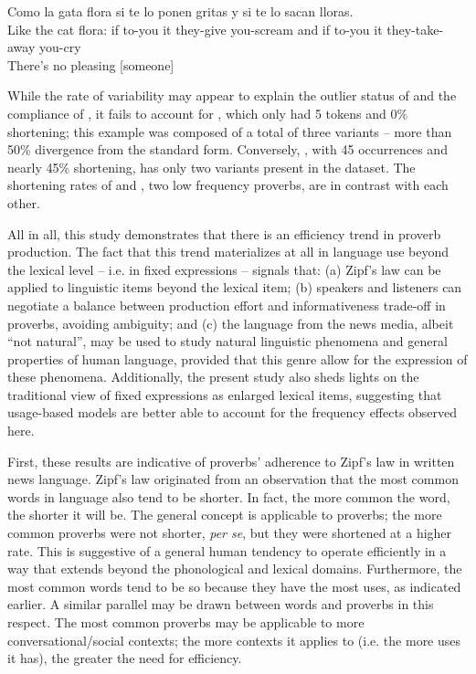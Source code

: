 \documentclass[output=paper,colorlinks,citecolor=brown,draftmode]{langscibook}
\begin{document}
\ex 
\gll Como la gata flora si te lo ponen gritas y si te lo sacan lloras.\\
Like 	the 	cat 	flora: 	if 	to-you 	it 	they-give you-scream 	and 	if 	to-you 	it 	they-take-away you-cry\\
\glt There’s no pleasing [someone]\\
\z
\z

While the rate of variability may appear to explain the outlier status of  and the compliance of , it fails to account for , which only had 5 tokens and 0\% shortening; this example was composed of a total of three variants -- more than 50\% divergence from the standard form. Conversely, , with 45 occurrences and nearly 45\% shortening, has only two variants present in the dataset. The shortening rates of  and , two low frequency proverbs, are in contrast with each other.

All in all, this study demonstrates that there is an efficiency trend in proverb production. The fact that this trend materializes at all in language use beyond the lexical level -- i.e. in fixed expressions -- signals that: (a) Zipf's law can be applied to linguistic items beyond the lexical item; (b) speakers and listeners can negotiate a balance between production effort and informativeness trade-off in proverbs, avoiding ambiguity; and (c) the language from the news media, albeit ``not natural'', may be used to study natural linguistic phenomena and general properties of human language, provided that this genre allow for the expression of these phenomena. Additionally, the present study also sheds lights on the traditional view of fixed expressions as enlarged lexical items, suggesting that usage-based models are better able to account for the frequency effects observed here.

First, these results are indicative of proverbs' adherence to Zipf's law in written news language. Zipf's law originated from an observation that the most common words in language also tend to be shorter. In fact, the more common the word, the shorter it will be. The general concept is applicable to proverbs; the more common proverbs were not shorter, \emph{per se}, but they were shortened at a higher rate. This is suggestive of a general human tendency to operate efficiently in a way that extends beyond the phonological and lexical domains. Furthermore, the most common words tend to be so because they have the most uses, as indicated earlier. A similar parallel may be drawn between words and proverbs in this respect. The most common proverbs may be applicable to more conversational/social contexts; the more contexts it applies to (i.e. the more uses it has), the greater the need for efficiency.
\end{document}
